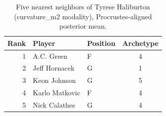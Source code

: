 \begin{table}[htbp]
  \centering\small
  \begin{tabular}{rllc}
    \toprule
    Rank & Player & Position & Archetype \\
    \midrule
    1 & A.C. Green & F & 4 \\
    2 & Jeff Hornacek & G & 1 \\
    3 & Keon Johnson & G & 5 \\
    4 & Karlo Matkovic & F & 4 \\
    5 & Nick Calathes & G & 4 \\
    \bottomrule
  \end{tabular}
  \caption{Five nearest neighbors of Tyrese Haliburton (curvature_m2 modality), Procrustes-aligned posterior mean.}
  \label{tab:Tyrese_Haliburton_neighbors_curvature_m2}
\end{table}


